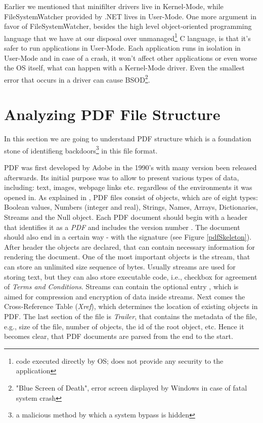 Earlier we mentioned that minifilter drivers live in Kernel-Mode, while FileSystemWatcher provided by .NET lives in User-Mode. One more argument in favor of FileSystemWatcher, besides the high level object-oriented programming language \CSharp that we have at our disposal over unmanaged\footnote{code executed directly by OS; does not provide any security to the application} C language, is that it's safer to run applications in User-Mode. Each application runs in isolation in User-Mode and in case of a crash, it won't affect other applications or even worse the OS itself, what can happen with a Kernel-Mode driver. Even the smallest error that occurs in a driver can cause BSOD\footnote{"Blue Screen of Death", error screen displayed by Windows in case of fatal system crash}. 

\newpage
\section{Analyzing PDF File Structure}
\label{section:pdfStructure}
In this section we are going to understand PDF structure which is a foundation stone of identifieng backdoors\footnote{a malicious method by which a system bypass is hidden} in this file format. \par
PDF was first developed by Adobe in the 1990's with many version been released afterwards. Its initial purpose was to allow to present various types of data, including: text, images, webpage links etc. regardless of the environments it was opened in. As explained in \cite{pdfReference}, PDF files consist of objects, which are of eight types: Boolean values, Numbers (integer and real), Strings, Names, Arrays, Dictionaries, Streams and the Null object. Each PDF document should begin with a header that identifies it as a \textit{PDF} and includes the version number . The document should also end in a certain way - with the signature  (see Figure \ref{pdfSkeleton}). After header the objects are declared, that can contain necessary information for rendering the document. One of the most important objects is the stream, that can store an unlimited size sequence of bytes. Usually streams are used for storing text, but they can also store executable code, i.e., checkbox for agreement of \textit{Terms and Conditions}. Streams can contain the optional entry , which is aimed for compression and encryption of data inside streams. Next comes the Cross-Reference Table (\textit{Xref}), which 
determines the location of existing objects in PDF. The last section of the file is \textit{Trailer}, that contains the metadata of the file, e.g., size of the file, number of objects, the id of the root object, etc. Hence it becomes clear, that PDF documents are parsed from the end to the start.

